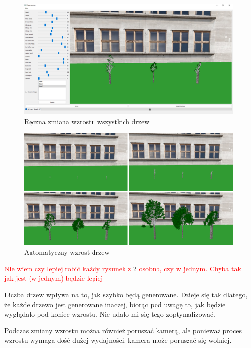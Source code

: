 \documentclass[a4paper,12pt,twoside]{book} %
\begin{document}
\begin{figure}[H]
	\centering\includegraphics[width=15.5cm]{grafika/program/percentGrow.png}
	\caption{Ręczna zmiana wzrostu wszystkich drzew}
    \label{fig:percentGrow}
\end{figure}


\begin{figure}[H]
	\centering\includegraphics[width=15.5cm]{grafika/program/AllGrow.png}
	\caption{Automatyczny wzrost drzew}
    \label{fig:growAll}
\end{figure}

\textcolor{red}{Nie wiem czy 
lepiej robić każdy rysunek z \ref{fig:growAll} osobno, 
czy w jednym. Chyba tak jak jest (w jednym) będzie lepiej}

Liczba drzew wpływa na to, jak szybko będą generowane. 
Dzieje się tak dlatego, że każde drzewo jest generowane inaczej, 
biorąc pod uwagę to, jak będzie wyglądało pod koniec wzrostu.
Nie udało mi się tego zoptymalizować.

Podczas zmiany wzrostu można również poruszać kamerą, 
ale ponieważ proces wzrostu wymaga dość dużej wydajności, 
kamera może poruszać się wolniej.
\end{document}
